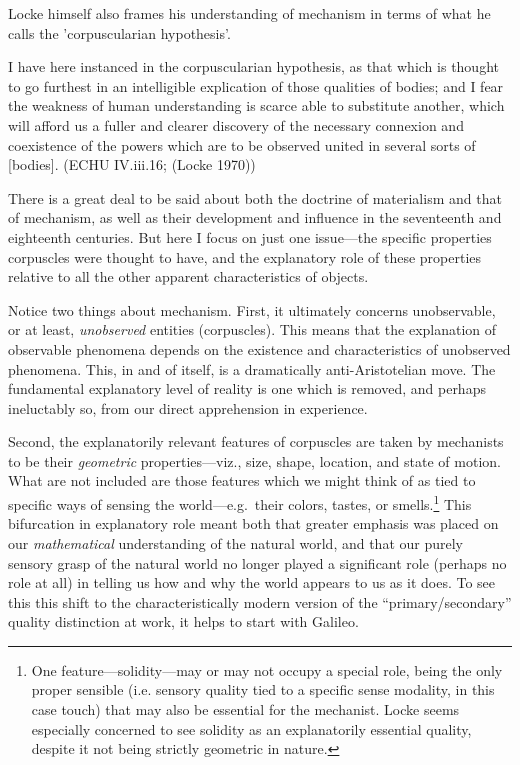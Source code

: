 \documentclass[12pt]{article}
\makeatletter
\newcommand{\citeprocitem}[2]{\hyper@linkstart{cite}{citeproc_bib_item_#1}#2\hyper@linkend}
\makeatother
\begin{document}
Locke himself also frames his understanding of mechanism in terms of what he calls
the 'corpuscularian hypothesis'.

\begin{quote-b}
I have here instanced in the corpuscularian hypothesis, as that which
is thought to go furthest in an intelligible explication of those
qualities of bodies; and I fear the weakness of human understanding is
scarce able to substitute another, which will afford us a fuller and
clearer discovery of the necessary connexion and coexistence of the
powers which are to be observed united in several sorts of [bodies].
(ECHU IV.iii.16; (\citeprocitem{6}{Locke 1970}))
\end{quote-b}

There is a great deal to be said about both the doctrine of materialism
and that of mechanism, as well as their development and influence in the
seventeenth and eighteenth centuries. But here I focus on just one
issue---the specific properties corpuscles were thought to have, and the
explanatory role of these properties relative to all the other apparent
characteristics of objects.

Notice two things about mechanism. First, it ultimately concerns unobservable, or at
least, \emph{unobserved} entities (corpuscles). This means that the explanation of
observable phenomena depends on the existence and characteristics of unobserved
phenomena. This, in and of itself, is a dramatically anti-Aristotelian move. The
fundamental explanatory level of reality is one which is removed, and perhaps
ineluctably so, from our direct apprehension in experience.

Second, the explanatorily relevant features of corpuscles are taken by
mechanists to be their \emph{geometric} properties---viz., size, shape, location, and
state of motion. What are not included are those features which we might think
of as tied to specific ways of sensing the world---e.g. their colors, tastes, or
smells.\footnote{One feature---solidity---may or may not occupy a special role, being the
only proper sensible (i.e. sensory quality tied to a specific sense
modality, in this case touch) that may also be essential for the
mechanist. Locke seems especially concerned to see solidity as an
explanatorily essential quality, despite it not being strictly geometric
in nature.} This bifurcation in explanatory role meant both that greater
emphasis was placed on our \emph{mathematical} understanding of the natural world, and
that our purely sensory grasp of the natural world no longer played a
significant role (perhaps no role at all) in telling us how and why the world
appears to us as it does. To see this this shift to the characteristically
modern version of the ``primary/secondary'' quality distinction at work, it helps
to start with Galileo.
\end{document}
